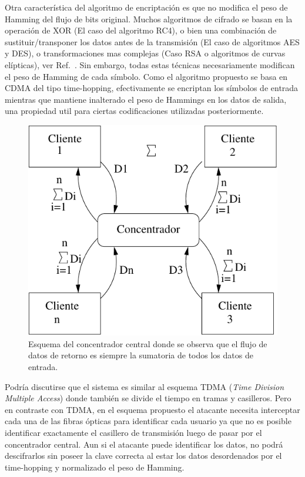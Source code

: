 Otra característica del algoritmo de encriptación es que no modifica el peso de Hamming del flujo de bits original. Muchos algoritmos de cifrado se basan en la operación de XOR (El caso del algoritmo RC4), o bien una combinación de sustituir/transponer los datos antes de la transmisión (El caso de algoritmos AES y DES), o transformaciones mas complejas (Caso RSA o algoritmos de curvas elípticas), ver Ref.~\cite{Menezes:1996:HAC:548089}.
Sin embargo, todas estas técnicas necesariamente modifican el peso de Hamming de cada símbolo. %
Como el algoritmo propuesto se basa en CDMA del tipo time-hopping, efectivamente se encriptan los símbolos de entrada mientras que mantiene inalterado el peso de Hammings en los datos de salida, una propiedad util para ciertas codificaciones utilizadas posteriormente. %

\begin{figure}[t]
  \centering
  \includegraphics[width=0.5 \textwidth]{graphs/concentrador} 
  \caption{Esquema del concentrador central donde se observa que el flujo de datos de retorno es siempre la sumatoria de todos los datos de entrada.}
  \label{fig_use}
\end{figure}

Podría discutirse que el sistema es similar al esquema TDMA (\textit{Time Division Multiple Access}) donde también se divide el tiempo en tramas y casilleros. Pero en contraste con TDMA, en el esquema propuesto el atacante necesita interceptar cada una de las fibras ópticas para identificar cada usuario ya que no es posible identificar exactamente el casillero de transmisión luego de pasar por el concentrador central. Aun si el atacante puede identificar los datos, no podrá descifrarlos sin poseer la clave correcta al estar los datos desordenados por el time-hopping y normalizado el peso de Hamming.

